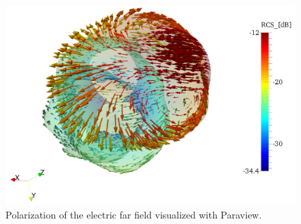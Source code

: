 \begin{figure}[h]
\centering
\includegraphics[width=13.4cm]{SpherePol}
\caption{Polarization of the electric far field visualized with Paraview.}
\label{fig:SpherePol}
\end{figure}